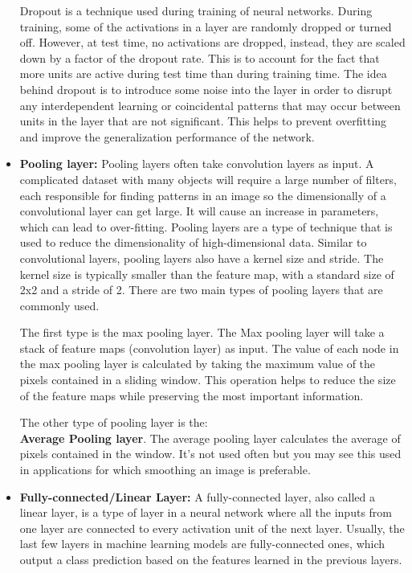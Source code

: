 \begin{itemize}
    Dropout is a technique used during training of neural networks. During training, some of the activations in a layer are randomly dropped or turned off. However, at test time, no activations are dropped, instead, they are scaled down by a factor of the dropout rate. This is to account for the fact that more units are active during test time than during training time. The idea behind dropout is to introduce some noise into the layer in order to disrupt any interdependent learning or coincidental patterns that may occur between units in the layer that are not significant. This helps to prevent overfitting and improve the generalization performance of the network. \\
    \item \textbf{Pooling layer: }Pooling layers often take convolution layers as input. A complicated dataset with many objects will require a large number of filters, each responsible for finding patterns in an image so the dimensionally of a convolutional layer can get large. It will cause an increase in parameters, which can lead to over-fitting. Pooling layers are a type of technique that is used to reduce the dimensionality of high-dimensional data. Similar to convolutional layers, pooling layers also have a kernel size and stride. The kernel size is typically smaller than the feature map, with a standard size of 2x2 and a stride of 2. There are two main types of pooling layers that are commonly used.

    The first type is the max pooling layer. The Max pooling layer will take a stack of feature maps (convolution layer) as input. The value of each node in the max pooling layer is calculated by taking the maximum value of the pixels contained in a sliding window. This operation helps to reduce the size of the feature maps while preserving the most important information.
    
    The other type of pooling layer is the: \\
    \textbf{Average Pooling layer}. The average pooling layer calculates the average of pixels contained in the window. It's not used often but you may see this used in applications for which smoothing an image is preferable.\\
    \item \textbf{Fully-connected/Linear Layer: } A fully-connected layer, also called a linear layer, is a type of layer in a neural network where all the inputs from one layer are connected to every activation unit of the next layer. Usually, the last few layers in machine learning models are fully-connected ones, which output a class prediction based on the features learned in the previous layers.


\end{itemize}
